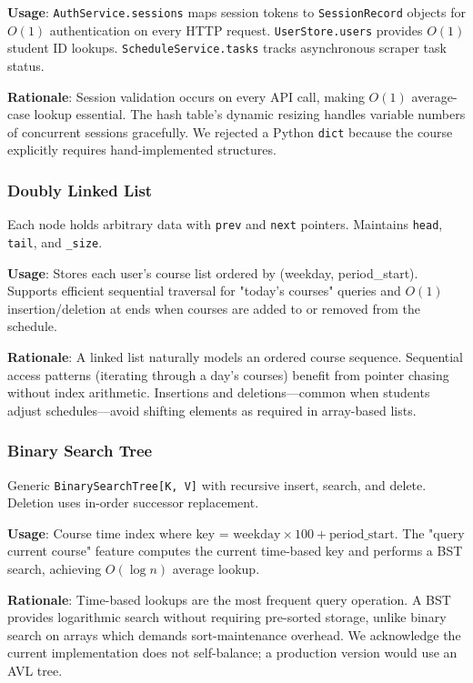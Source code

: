 \documentclass[11pt,a4paper]{article}
\begin{document}
\textbf{Usage}: \texttt{AuthService.sessions} maps session tokens to \texttt{SessionRecord} objects for $O(1)$ authentication on every HTTP request. \texttt{UserStore.users} provides $O(1)$ student ID lookups. \texttt{ScheduleService.tasks} tracks asynchronous scraper task status.

\textbf{Rationale}: Session validation occurs on every API call, making $O(1)$ average-case lookup essential. The hash table's dynamic resizing handles variable numbers of concurrent sessions gracefully. We rejected a Python \texttt{dict} because the course explicitly requires hand-implemented structures.

\subsubsection{Doubly Linked List}
Each node holds arbitrary data with \texttt{prev} and \texttt{next} pointers. Maintains \texttt{head}, \texttt{tail}, and \texttt{\_size}.

\textbf{Usage}: Stores each user's course list ordered by (weekday, period\_start). Supports efficient sequential traversal for "today's courses" queries and $O(1)$ insertion/deletion at ends when courses are added to or removed from the schedule.

\textbf{Rationale}: A linked list naturally models an ordered course sequence. Sequential access patterns (iterating through a day's courses) benefit from pointer chasing without index arithmetic. Insertions and deletions---common when students adjust schedules---avoid shifting elements as required in array-based lists.

\subsubsection{Binary Search Tree}
Generic \texttt{BinarySearchTree[K, V]} with recursive insert, search, and delete. Deletion uses in-order successor replacement.

\textbf{Usage}: Course time index where key = $\text{weekday} \times 100 + \text{period\_start}$. The "query current course" feature computes the current time-based key and performs a BST search, achieving $O(\log n)$ average lookup.

\textbf{Rationale}: Time-based lookups are the most frequent query operation. A BST provides logarithmic search without requiring pre-sorted storage, unlike binary search on arrays which demands sort-maintenance overhead. We acknowledge the current implementation does not self-balance; a production version would use an AVL tree.
\end{document}
